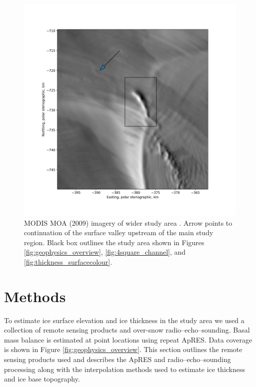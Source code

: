 \begin{figure}[!ht]
\centering
\includegraphics[width=1.0\textwidth]{chapters/2/moa_solo.png}
\caption[Image of valley]{MODIS MOA (2009) imagery of wider study area \citep{haran2014modis}. Arrow points to continuation of the surface valley upstream of the main study region. Black box outlines the study area shown in Figures \ref{fig:geophysics_overview}, \ref{fig:4square_channel}, and \ref{fig:thickness_surfacecolour}. }
\label{fig:moa_solo}
\end{figure}
\newpage


\section{Methods} \label{sec:method}

To estimate ice surface elevation and ice thickness in the study area we used a collection of remote sensing products and over-snow radio--echo--sounding. Basal mass balance is estimated at point locations using repeat ApRES. Data coverage is shown in Figure \ref{fig:geophysics_overview}. This section outlines the remote sensing products used and describes the ApRES and radio--echo--sounding processing along with the interpolation methods used to estimate ice thickness and ice base topography. 

